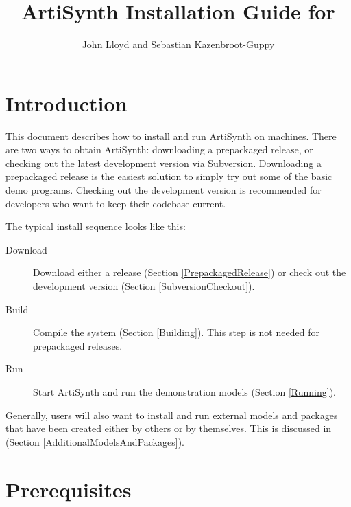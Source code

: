 \title{ArtiSynth Installation Guide for \SYSTEM}
\author{John Lloyd and Sebastian Kazenbroot-Guppy}
\iflatexml
\date{}
\fi

\newif\ifNeedLibraryPath
\NeedLibraryPathtrue



\maketitle

\iflatexml{\large\pubdate}\fi

\tableofcontents

\section{Introduction}

This document describes how to install and run ArtiSynth on \FULLSYSTEM
machines. There are two ways to obtain ArtiSynth: downloading
a prepackaged release, or checking out the latest development version
via Subversion. Downloading a prepackaged release is the easiest
solution to simply try out some of the basic demo programs. Checking
out the development version is recommended for developers who want to
keep their codebase current.

The typical install sequence looks like this:

\begin{description}

\item[Download]
Download either a release (Section \ref{PrepackagedRelease}) or 
check out the development version (Section \ref{SubversionCheckout}).

\item[Build]
Compile the system (Section \ref{Building}). This
step is not needed for prepackaged releases.

\item[Run] 
Start ArtiSynth and run the demonstration models (Section \ref{Running}).

\end{description}

Generally, users will also want to install and run external models and
packages that have been created either by others or by themselves.
This is discussed in (Section \ref{AdditionalModelsAndPackages}).

\section{Prerequisites}

